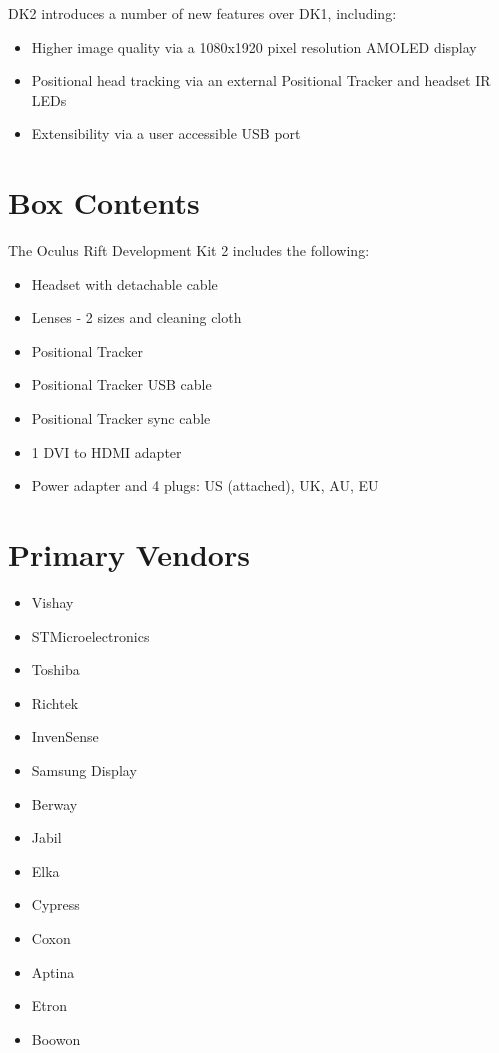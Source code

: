 \documentclass[letterpaper]{article}
\begin{document}
DK2 introduces a number of new features over DK1, including:

\begin{itemize}
    \item Higher image quality via a 1080x1920 pixel resolution AMOLED display
    \item Positional head tracking via an external Positional Tracker and headset IR LEDs    
    \item Extensibility via a user accessible USB port
\end{itemize}

\newpage

\section{Box Contents}
The Oculus Rift Development Kit 2 includes the following:

\begin{itemize}
    \item Headset with detachable cable
    \item Lenses - 2 sizes and cleaning cloth
    \item Positional Tracker
    \item Positional Tracker USB cable
    \item Positional Tracker sync cable
    \item 1 DVI to HDMI adapter
    \item Power adapter and 4 plugs: US (attached), UK, AU, EU
\end{itemize}

\newpage

\section{Primary Vendors}

\begin{itemize}
    \item Vishay
    \item STMicroelectronics
    \item Toshiba
    \item Richtek
    \item InvenSense
    \item Samsung Display
    \item Berway
    \item Jabil
    \item Elka
    \item Cypress
    \item Coxon
    \item Aptina
    \item Etron
    \item Boowon
\end{itemize}
\end{document}
